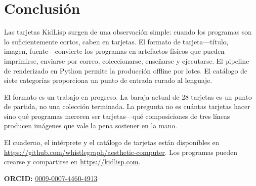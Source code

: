 \documentclass[10pt,letterpaper,twocolumn]{article}
\begin{document}

\section{Conclusi\'on}

Las tarjetas KidLisp surgen de una observaci\'on simple: cuando los programas son lo suficientemente cortos, caben en tarjetas. El formato de tarjeta---t\'itulo, imagen, fuente---convierte los programas en artefactos f\'isicos que pueden imprimirse, enviarse por correo, coleccionarse, ense\~narse y ejecutarse. El pipeline de renderizado en Python permite la producci\'on offline por lotes. El cat\'alogo de siete categor\'ias proporciona un punto de entrada curado al lenguaje.

El formato es un trabajo en progreso. La baraja actual de 28 tarjetas es un punto de partida, no una colecci\'on terminada. La pregunta no es cu\'antas tarjetas hacer sino qu\'e programas merecen ser tarjetas---qu\'e composiciones de tres l\'ineas producen im\'agenes que vale la pena sostener en la mano.

El cuaderno, el int\'erprete y el cat\'alogo de tarjetas est\'an disponibles en \url{https://github.com/whistlegraph/aesthetic-computer}. Los programas pueden crearse y compartirse en \url{https://kidlisp.com}.

\vspace{0.5em}
\noindent\textbf{ORCID:} \href{https://orcid.org/0009-0007-4460-4913}{0009-0007-4460-4913}




\end{document}

